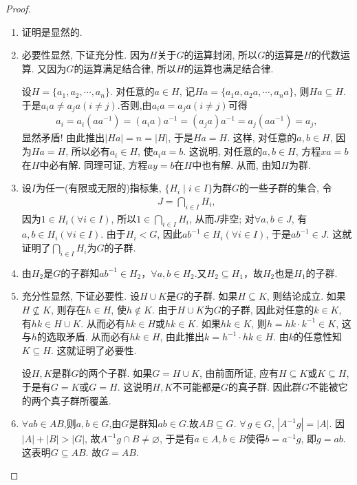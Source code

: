 \documentclass[../../main.tex]{subfiles}%
\begin{document}
\begin{proof}
\begin{enumerate}[(1)]
\item 证明是显然的.

\item 必要性显然, 下证充分性.
因为$H$关于$G$的运算封闭, 所以$G$的运算是$H$的代数运算. 又因为$G$的运算满足结合律, 所以$H$的运算也满足结合律.

设$H=\{a_1,a_2,\cdots,a_n\}$. 对任意的$a\in H$, 记$Ha=\{a_1a,a_2a,\cdots,a_na\}$, 则$Ha\subseteq H$.
于是$a_ia\neq a_ja(i\neq j)$.否则,由$a_ia = a_ja(i\neq j)$可得
\begin{align*}
a_i=a_i(aa^{-1})=(a_ia)a^{-1}=(a_ja)a^{-1}=a_j(aa^{-1})=a_j,
\end{align*}
显然矛盾!
由此推出$|Ha|=n=|H|$, 于是$Ha=H$. 这样, 对任意的$a,b\in H$, 因为$Ha=H$, 所以必有$a_i\in H$, 使$a_ia=b$. 这说明, 对任意的$a,b\in H$, 方程$xa=b$在$H$中必有解. 同理可证, 方程$ay=b$在$H$中也有解. 从而, 由知$H$为群.

\item 设$I$为任一(有限或无限的)指标集, $\{H_i\mid i\in I\}$为群$G$的一些子群的集合, 令
\begin{align*}
J = \bigcap\limits_{i\in I} H_i,
\end{align*}
因为$1\in H_i(\forall i\in I)$, 所以$1\in \bigcap\limits_{i\in I} H_i$, 从而$J$非空;
对$\forall a,b\in J$, 有$a,b\in H_i(\forall i\in I)$. 由于$H_i < G$, 因此$ab^{-1}\in H_i(\forall i\in I)$, 于是$ab^{-1}\in J$.
这就证明了$\bigcap\limits_{i\in I} H_i$为$G$的子群.

\item 由$H_2$是$G$的子群知$ab^{-1} \in H_2$，$\forall a,b \in H_2$.又$H_2 \subseteq H_1$，故$H_2$也是$H_1$的子群.

\item 充分性显然, 下证必要性.
设$H\cup K$是$G$的子群. 如果$H\subseteq K$, 则结论成立. 如果$H\nsubseteq K$, 则存在$h\in H$, 使$h\notin K$. 由于$H\cup K$为$G$的子群, 因此对任意的$k\in K$, 有$hk\in H\cup K$. 从而必有$hk\in H$或$hk\in K$. 如果$hk\in K$, 则$h=hk\cdot k^{-1}\in K$, 这与$h$的选取矛盾. 从而必有$hk\in H$, 由此推出$k=h^{-1}\cdot hk\in H$. 由$k$的任意性知$K\subseteq H$. 这就证明了必要性.

设$H,K$是群$G$的两个子群. 如果$G=H\cup K$, 由前面所证, 应有$H\subseteq K$或$K\subseteq H$, 于是有$G=K$或$G=H$. 这说明$H,K$不可能都是$G$的真子群. 因此群$G$不能被它的两个真子群所覆盖.

\item $\forall ab\in AB$,则$a,b\in G$,由$G$是群知$ab\in G$.故$AB\subseteq G$.
$\forall\,g\in G$, $|A^{-1}g|=|A|$. 因$|A|+|B|>|G|$, 故$A^{-1}g\cap B\neq\varnothing$, 于是有$a\in A, b\in B$使得$b=a^{-1}g$, 即$g=ab$. 这表明$G\subseteq AB$.
故$G = AB$.
\end{enumerate}

\end{proof}
\end{document}
